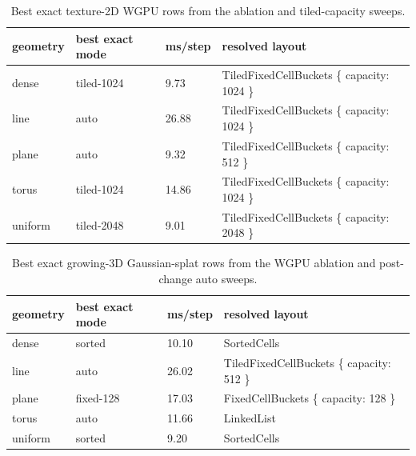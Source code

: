 \documentclass[10pt,twocolumn]{article}
\begin{document}
\begin{table}[t]
\centering
\small
\begin{tabular}{llll}
\toprule
geometry & best exact mode & ms/step & resolved layout \\
\midrule
dense & tiled-1024 & 9.73 & TiledFixedCellBuckets \{ capacity: 1024 \} \\
line & auto & 26.88 & TiledFixedCellBuckets \{ capacity: 1024 \} \\
plane & auto & 9.32 & TiledFixedCellBuckets \{ capacity: 512 \} \\
torus & tiled-1024 & 14.86 & TiledFixedCellBuckets \{ capacity: 1024 \} \\
uniform & tiled-2048 & 9.01 & TiledFixedCellBuckets \{ capacity: 2048 \} \\
\bottomrule
\end{tabular}
\caption{Best exact texture-2D WGPU rows from the ablation and tiled-capacity sweeps.}
\label{tab:texture2d}
\end{table}

\begin{table}[t]
\centering
\small
\begin{tabular}{llll}
\toprule
geometry & best exact mode & ms/step & resolved layout \\
\midrule
dense & sorted & 10.10 & SortedCells \\
line & auto & 26.02 & TiledFixedCellBuckets \{ capacity: 512 \} \\
plane & fixed-128 & 17.03 & FixedCellBuckets \{ capacity: 128 \} \\
torus & auto & 11.66 & LinkedList \\
uniform & sorted & 9.20 & SortedCells \\
\bottomrule
\end{tabular}
\caption{Best exact growing-3D Gaussian-splat rows from the WGPU ablation and post-change auto sweeps.}
\label{tab:3d}
\end{table}
\end{document}
